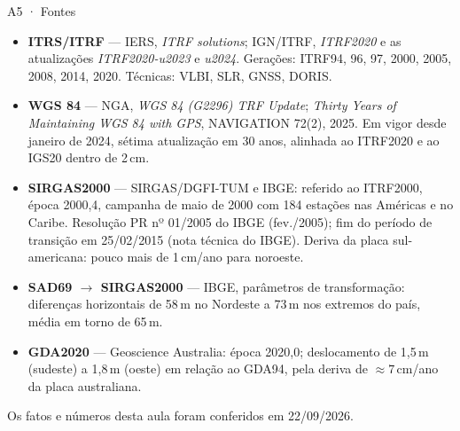 \documentclass[aspectratio=169,11pt]{beamer}
\begin{document}
\begin{frame}{A5 · Fontes}
  \scriptsize
  \begin{itemize}
    \item \textbf{ITRS/ITRF} --- IERS, \emph{ITRF solutions}; IGN/ITRF, \emph{ITRF2020} e as
          atualizações \emph{ITRF2020-u2023} e \emph{u2024}. Gerações: ITRF94, 96, 97, 2000,
          2005, 2008, 2014, 2020. Técnicas: VLBI, SLR, GNSS, DORIS.
    \item \textbf{WGS 84} --- NGA, \emph{WGS 84 (G2296) TRF Update}; \emph{Thirty Years of
          Maintaining WGS 84 with GPS}, NAVIGATION 72(2), 2025. Em vigor desde janeiro de
          2024, sétima atualização em 30 anos, alinhada ao ITRF2020 e ao IGS20 dentro de
          2\,cm.
    \item \textbf{SIRGAS2000} --- SIRGAS/DGFI-TUM e IBGE: referido ao ITRF2000, época
          2000,4, campanha de maio de 2000 com 184 estações nas Américas e no Caribe.
          Resolução PR nº 01/2005 do IBGE (fev./2005); fim do período de transição em
          25/02/2015 (nota técnica do IBGE). Deriva da placa sul-americana: pouco mais de
          1\,cm/ano para noroeste.
    \item \textbf{SAD69 $\to$ SIRGAS2000} --- IBGE, parâmetros de transformação: diferenças
          horizontais de 58\,m no Nordeste a 73\,m nos extremos do país, média em torno de
          65\,m.
    \item \textbf{GDA2020} --- Geoscience Australia: época 2020,0; deslocamento de 1,5\,m
          (sudeste) a 1,8\,m (oeste) em relação ao GDA94, pela deriva de $\approx 7$\,cm/ano
          da placa australiana.
  \end{itemize}
  \medskip
  \normalsize
  \centering
  Os fatos e números desta aula foram conferidos em 22/09/2026.
\end{frame}
\end{document}

